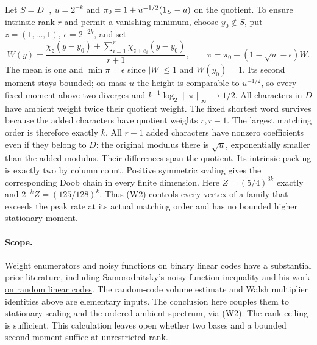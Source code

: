 Let \(S=D^\perp,\ u=2^{-k}\) and
\(\pi_0=1+u^{-1/2}({\bf1}_S-u)\) on the quotient.
To ensure intrinsic rank \(r\) and permit a vanishing minimum, choose
\(y_0\notin S\), put \(z=(1,\ldots,1)\), \(\epsilon=2^{-2k}\), and set
\[
 W(y)=\frac{\chi_z(y-y_0)+\sum_{i=1}^{r}\chi_{z+e_i}(y-y_0)}{r+1},
 \qquad
 \pi=\pi_0-(1-\sqrt u-\epsilon)W .
\]
The mean is one and \(\min\pi=\epsilon\) since \(|W|\le1\) and
\(W(y_0)=1\). Its second moment stays bounded; on mass \(u\) the height
is comparable to \(u^{-1/2}\), so every fixed moment above two diverges
and \(k^{-1}\log_2\|\pi\|_\infty\to1/2\). All characters in \(D\)
have ambient weight twice their quotient weight. The fixed shortest
word survives because the added characters have quotient weights \(r,r-1\).
The largest matching order is therefore exactly \(k\).
All \(r+1\) added characters have nonzero coefficients even if they belong
to \(D\): the original modulus there is \(\sqrt u\), exponentially smaller
than the added modulus. Their differences span the quotient. Its intrinsic
packing is exactly two by column count. Positive symmetric scaling gives
the corresponding Doob chain in every finite dimension.
Here \(Z=(5/4)^{3k}\) exactly and \(2^{-k} Z=(125/128)^k\).
Thus (W2) controls every vertex of a family that exceeds the peak rate
at its actual matching order and has no bounded higher stationary moment.

\paragraph{Scope.}
Weight enumerators and noisy functions on binary linear codes have a
substantial prior literature, including
\href{https://arxiv.org/abs/1809.09696}{Samorodnitsky's noisy-function
inequality} and his \href{https://arxiv.org/abs/2205.02051}{work on random
linear codes}. The random-code volume estimate and Walsh multiplier
identities above are elementary inputs. The conclusion here couples them
to stationary scaling and the ordered ambient spectrum, via (W2).
The rank ceiling is sufficient. This calculation leaves open whether two
bases and a bounded second moment suffice at unrestricted rank.
